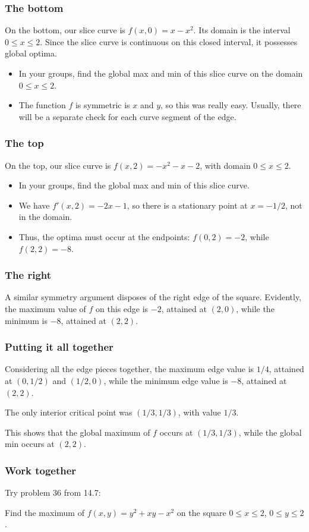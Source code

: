 \documentclass[%
  11pt,%
  ignorenonframetext,%
  xcolor={svgnames},%
  aspectratio=169%
]{beamer}
\begin{document}
\begin{frame}\frametitle{The bottom}

On the bottom, our slice curve is $f(x, 0) = x - x^2$. Its domain is the
interval $0 \leq x \leq 2$. Since the slice curve is continuous on this
closed interval, it possesses global optima.

\begin{itemize}
\item
  In your groups, find the global max and min of this slice curve on the
  domain $0 \leq x \leq 2$.
  \pause
\item
  The function $f$ is symmetric is $x$ and $y$, so this was really easy.
  Usually, there will be a separate check for each curve segment of the
  edge.
\end{itemize}

\end{frame}

\begin{frame}\frametitle{The top}

On the top, our slice curve is $f(x, 2) = -x^2 - x - 2$, with domain
$0 \leq x \leq 2$.

\begin{itemize}
\item
  In your groups, find the global max and min of this slice curve.
  \pause
\item
  We have $f'(x,2) = -2x - 1$, so there is a stationary point at
  $x = -1/2$, not in the domain.
  \pause
\item
  Thus, the optima must occur at the endpoints: $f(0,2) = -2$, while
  $f(2,2) = -8$.
\end{itemize}

\end{frame}

\begin{frame}\frametitle{The right}

A similar symmetry argument disposes of the right edge of the square.
Evidently, the maximum value of $f$ on this edge is $-2$, attained at
$(2,0)$, while the minimum is $-8$, attained at $(2, 2)$.

\end{frame}

\begin{frame}\frametitle{Putting it all together}

Considering all the edge pieces together, the maximum edge value is
$1/4$, attained at $(0, 1/2)$ and $(1/2, 0)$, while the minimum edge
value is $-8$, attained at $(2,2)$.

The only interior critical point was $(1/3, 1/3)$, with value $1/3$.

This shows that the global maximum of $f$ occurs at $(1/3, 1/3)$, while
the global min occurs at $(2,2)$.

\end{frame}

\begin{frame}\frametitle{Work together}

Try problem 36 from 14.7:

Find the maximum of $f(x,y) = y^2 + xy - x^2$ on the square
$0 \leq x \leq 2$, $0 \leq y \leq 2$.

\end{frame}
\end{document}

